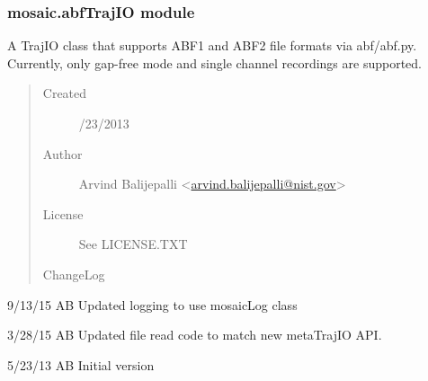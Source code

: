 \documentclass[letterpaper,10pt,english]{sphinxmanual}
\begin{document}
\subsubsection{mosaic.abfTrajIO module}
\label{api-doc/mosaic.traj:mosaic-abftrajio-module}\label{api-doc/mosaic.traj:module-mosaic.abfTrajIO}
A TrajIO class that supports ABF1 and ABF2 file formats via abf/abf.py. Currently, only
gap-free mode and single channel recordings are supported.
\begin{quote}\begin{description}
\item[{Created}] /23/2013

\item[{Author}] \leavevmode
Arvind Balijepalli \textless{}\href{mailto:arvind.balijepalli@nist.gov}{arvind.balijepalli@nist.gov}\textgreater{}

\item[{License}] \leavevmode
See LICENSE.TXT

\item[{ChangeLog}] \leavevmode
\end{description}\end{quote}

\begin{DUlineblock}{0em}
\item[] 9/13/15         AB      Updated logging to use mosaicLog class
\item[] 3/28/15         AB      Updated file read code to match new metaTrajIO API.
\item[] 5/23/13         AB      Initial version
\end{DUlineblock}
\end{document}
